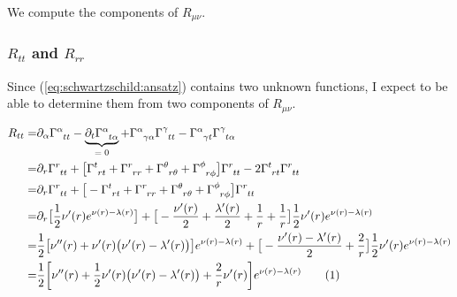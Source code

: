 \documentclass[]{article}
\newcommand\numberthis{\addtocounter{equation}{1}\tag{\theequation}}
\begin{document}
We compute the components of $R_{\mu\nu}$.

\subsubsection{$R_{tt}$ and $R_{rr}$}
Since (\ref{eq:schwartzschild:ansatz}) contains two unknown functions, I expect to be able to determine them from two components of $R_{\mu\nu}$.

\begin{align*}
	R_{tt} =& \partial_\alpha \Gamma\indices{^\alpha_{tt}} - \underbrace{\partial_t \Gamma\indices{^\alpha_{t\alpha}}}_\text{$=0$} + \Gamma\indices{^\alpha_{\gamma\alpha}} \Gamma\indices{^\gamma_{tt}} - \Gamma\indices{^\alpha_{\gamma t}} \Gamma\indices{^\gamma_{t\alpha}} \\
	=& \partial_r \Gamma\indices{^r_{tt}}  + \big[\Gamma\indices{^t_{rt}}+\Gamma\indices{^r_{rr}} + \Gamma\indices{^\theta_{r\theta}}+ \Gamma\indices{^\phi_{r\phi}}\big] \Gamma\indices{^r_{tt}} - 2\Gamma\indices{^t_{r t}} \Gamma\indices{^r_{tt}} \\
	=& \partial_r \Gamma\indices{^r_{tt}}  + \big[-\Gamma\indices{^t_{rt}}+\Gamma\indices{^r_{rr}} + \Gamma\indices{^\theta_{r\theta}}+ \Gamma\indices{^\phi_{r\phi}}\big] \Gamma\indices{^r_{tt}} \\
	=& \partial_r \big[\frac{1}{2} \nu^\prime(r) e^{\nu(r)-\lambda(r)}\big]  + \big[-\frac{\nu^\prime(r)}{2}+\frac{\lambda^\prime(r)}{2} + \frac{1}{r} + \frac{1}{r}\big] \frac{1}{2} \nu^\prime(r) e^{\nu(r)-\lambda(r)}  \\
	=& \frac{1}{2} \big[ \nu^{\prime\prime}(r) + \nu^\prime(r) \big(\nu^\prime(r)-\lambda^\prime(r)\big)\big] e^{\nu(r)-\lambda(r)}+ \big[-\frac{\nu^\prime(r)-\lambda^\prime(r)}{2} + \frac{2}{r}\big] \frac{1}{2} \nu^\prime(r) e^{\nu(r)-\lambda(r)} \\
	=& \frac{1}{2} \bigg[\nu^{\prime\prime}(r) + \frac{1}{2}\nu^\prime(r) \big(\nu^\prime(r)-\lambda^\prime(r)\big)+ \frac{2}{r}\nu^\prime(r)\bigg] e^{\nu(r)-\lambda(r)} \numberthis \label{eq:Rtt}
\end{align*}
\end{document}
